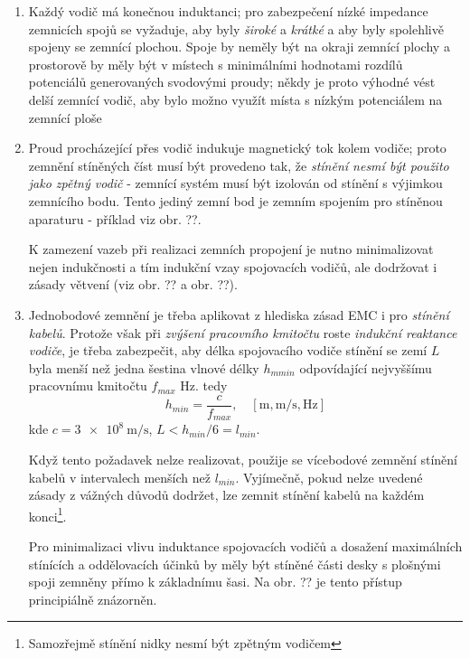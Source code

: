       \begin{enumerate}[leftmargin=20pt,rightmargin=10pt, label=\emph{\alph*})]
        \item Každý vodič má konečnou induktanci; pro zabezpečení nízké impedance zemnicích spojů se
              vyžaduje, aby byly \emph{široké} a \emph{krátké} a aby byly spolehlivě spojeny se
              zemnící plochou. Spoje by neměly být na okraji zemnící plochy a prostorově by měly být
              v místech s minimálními hodnotami rozdílů potenciálů generovaných svodovými proudy;
              někdy je proto výhodné vést delší zemnící vodič, aby bylo možno využít místa s nízkým
              potenciálem na zemnící ploše
        \item Proud procházející přes vodič indukuje magnetický tok kolem vodiče; proto zemnění
              stíněných číst musí být provedeno tak, že \emph{stínění nesmí být použito jako zpětný
              vodič} - zemnící systém musí být izolován od stínění s výjimkou zemnícího bodu. Tento
              jediný zemní bod je zemním spojením pro stíněnou aparaturu - příklad viz obr. ??.

              K zamezení vazeb při realizaci zemních propojení je nutno minimalizovat nejen
              indukčnosti a tím indukční vzay spojovacích vodičů, ale dodržovat i zásady větvení
              (viz obr. ?? a obr. ??).
        \item Jednobodové zemnění je třeba aplikovat z hlediska zásad EMC i pro \emph{stínění
              kabelů}. Protože však při \emph{zvýšení pracovního kmitočtu} roste \emph{indukční
              reaktance vodiče}, je třeba zabezpečit, aby délka spojovacího vodiče stínění se zemí
              \(L\) byla menší než jedna šestina vlnové délky \(h_{mmin}\) odpovídající nejvyššímu
              pracovnímu kmitočtu \(f_{max}\) \unit{\Hz}. tedy
              \begin{equation*}
                h_{min} = \dfrac{c}{f_{max}}, \quad [\unit{\m}, \unit{\m\per\s}, \unit{\Hz}]
              \end{equation*}
              kde \(c = \qty{3e8}{\m\per\s}\), \(L<h_{min}/6 = l_{min}\). 

              Když tento požadavek nelze realizovat, použije se vícebodové zemnění stínění kabelů v
              intervalech menších než \(l_{min}\). Vyjímečně, pokud nelze uvedené zásady z vážných
              důvodů dodržet, lze zemnit stínění kabelů na každém konci\footnote{Samozřejmě stínění
              nidky nesmí být zpětným vodičem}.

              Pro minimalizaci vlivu induktance spojovacích vodičů a dosažení maximálních stínících
              a oddělovacích účinků by měly být stíněné části desky s plošnými spoji zemněny přímo k
              základnímu šasi. Na obr. ?? je tento přístup principiálně znázorněn.
                      
      \end{enumerate}

